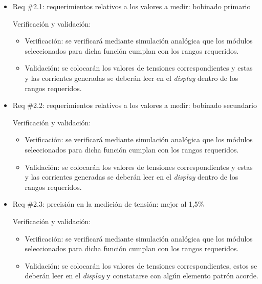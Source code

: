 \documentclass[11pt]{charter}
\begin{document}
\begin{itemize} 
\item Req \#2.1: requerimientos relativos a los valores a medir: bobinado primario

Verificación y validación:

\begin{itemize}
\item Verificación: se verificará mediante simulación analógica que los módulos seleccionados para dicha función cumplan con los rangos requeridos.
\item Validación: se colocarán los valores de tensiones correspondientes y estas y las corrientes generadas se deberán leer en el \textit{display} dentro de los rangos requeridos.
\end{itemize}

\end{itemize}

\begin{itemize} 
\item Req \#2.2: requerimientos relativos a los valores a medir: bobinado secundario

Verificación y validación:

\begin{itemize}
\item Verificación: se verificará mediante simulación analógica que los módulos seleccionados para dicha función cumplan con los rangos requeridos.
\item Validación: se colocarán los valores de tensiones correspondientes y estas y las corrientes generadas se deberán leer en el \textit{display} dentro de los rangos requeridos.
\end{itemize}

\end{itemize}

\begin{itemize} 
\item Req \#2.3: precisión en la medición de tensión: mejor al 1,5\% 

Verificación y validación:

\begin{itemize}
\item Verificación: se verificará mediante simulación analógica que los módulos seleccionados para dicha función cumplan con los rangos requeridos.
\item Validación: se colocarán los valores de tensiones correspondientes, estos se deberán leer en el \textit{display} y constatarse con algún elemento patrón acorde.  
\end{itemize}

\end{itemize}
\end{document}
